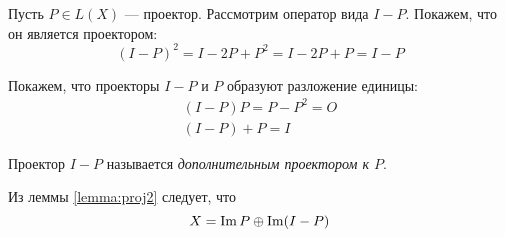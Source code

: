 Пусть $P \in L(X)$ — проектор. Рассмотрим оператор вида $ I - P $. Покажем, что
он является проектором:
\[ (I - P)^2 = I - 2P + P^2 = I - 2P + P = I - P \]

Покажем, что проекторы $I - P$ и $P$ образуют разложение единицы:
\[ \begin{gathered}
    (I - P)P = P - P^2 = O \\
    (I - P) + P = I 
\end{gathered} \]

Проектор $I-P$ называется \emph{дополнительным проектором к $P$}.

Из леммы \ref{lemma:proj2} следует, что
\[ X = \operatorname{Im} P \oplus \operatorname{Im} (I - P) \]
